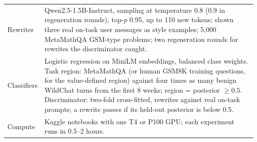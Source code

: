 \begin{table}[h]
\begin{tabular}{p{}p{}}
Rewriter & Qwen2.5-1.5B-Instruct, sampling at temperature 0.8 (0.9 in regeneration rounds), top-$p$ 0.95, up to 110 new tokens; shown three real on-task user messages as style examples; 5{,}000 MetaMathQA GSM-type problems; two regeneration rounds for rewrites the discriminator caught. \\
Classifiers & Logistic regression on MiniLM embeddings, balanced class weights. Task region: MetaMathQA (or human GSM8K training questions, for the value-defined region) against four times as many benign WildChat turns from the first 8 weeks; region = posterior $\ge0.5$. Discriminator: two-fold cross-fitted, rewrites against real on-task prompts; a rewrite passes if its held-out posterior is below 0.5. \\
Compute & Kaggle notebooks with one T4 or P100 GPU; each experiment runs in 0.5--2 hours. \\
\bottomrule
\end{tabular}
\end{table}